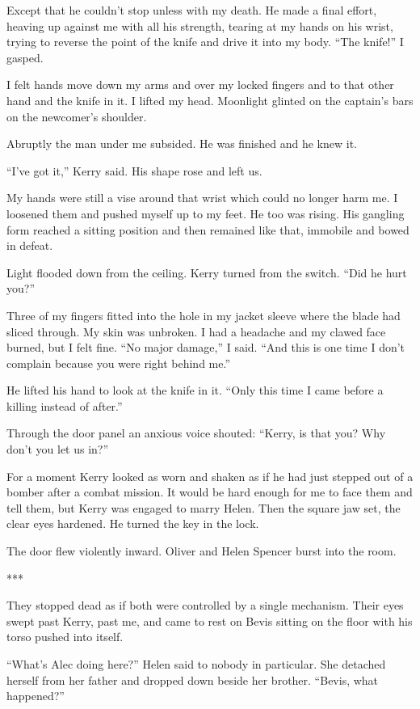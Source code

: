 \documentclass{novel}
\begin{document}
Except that he couldn’t stop unless with my death. He made a final effort, heaving up against me with all his strength, tearing at my hands on his wrist, trying to reverse the point of the knife and drive it into my body. “The knife!” I gasped.

I felt hands move down my arms and over my locked fingers and to that other hand and the knife in it. I lifted my head. Moonlight glinted on the captain’s bars on the newcomer’s shoulder.

Abruptly the man under me subsided. He was finished and he knew it.

“I’ve got it,” Kerry said. His shape rose and left us.

My hands were still a vise around that wrist which could no longer harm me. I loosened them and pushed myself up to my feet. He too was rising. His gangling form reached a sitting position and then remained like that, immobile and bowed in defeat.

Light flooded down from the ceiling. Kerry turned from the switch. “Did he hurt you?”

Three of my fingers fitted into the hole in my jacket sleeve where the blade had sliced through. My skin was unbroken. I had a headache and my clawed face burned, but I felt fine. “No major damage,” I said. “And this is one time I don’t complain because you were right behind me.”

He lifted his hand to look at the knife in it. “Only this time I came before a killing instead of after.”

Through the door panel an anxious voice shouted: “Kerry, is that you? Why don’t you let us in?”

For a moment Kerry looked as worn and shaken as if he had just stepped out of a bomber after a combat mission. It would be hard enough for me to face them and tell them, but Kerry was engaged to marry Helen. Then the square jaw set, the clear eyes hardened. He turned the key in the lock.

The door flew violently inward. Oliver and Helen Spencer burst into the room.

***

They stopped dead as if both were controlled by a single mechanism. Their eyes swept past Kerry, past me, and came to rest on Bevis sitting on the floor with his torso pushed into itself.

“What’s Alec doing here?” Helen said to nobody in particular. She detached herself from her father and dropped down beside her brother. “Bevis, what happened?”
\end{document}
